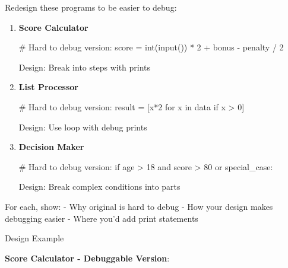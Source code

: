 \documentclass[
  letterpaper,
  DIV=11,
  numbers=noendperiod,
  oneside]{scrreprt}
\newenvironment{Shaded}{}{}
\newcommand{\BuiltInTok}[1]{\textcolor[rgb]{0.84,0.23,0.29}{#1}}
\newcommand{\CommentTok}[1]{\textcolor[rgb]{0.42,0.45,0.49}{#1}}
\newcommand{\ControlFlowTok}[1]{\textcolor[rgb]{0.84,0.23,0.29}{#1}}
\newcommand{\DecValTok}[1]{\textcolor[rgb]{0.00,0.36,0.77}{#1}}
\newcommand{\KeywordTok}[1]{\textcolor[rgb]{0.84,0.23,0.29}{#1}}
\newcommand{\NormalTok}[1]{\textcolor[rgb]{0.14,0.16,0.18}{#1}}
\newcommand{\OperatorTok}[1]{\textcolor[rgb]{0.14,0.16,0.18}{#1}}
\begin{document}
Redesign these programs to be easier to debug:

\begin{enumerate}
\def\labelenumi{\arabic{enumi}.}
\item
  \textbf{Score Calculator}

\begin{Shaded}
\begin{Highlighting}[]
\CommentTok{\# Hard to debug version:}
\NormalTok{score }\OperatorTok{=} \BuiltInTok{int}\NormalTok{(}\BuiltInTok{input}\NormalTok{()) }\OperatorTok{*} \DecValTok{2} \OperatorTok{+}\NormalTok{ bonus }\OperatorTok{{-}}\NormalTok{ penalty }\OperatorTok{/} \DecValTok{2}
\end{Highlighting}
\end{Shaded}

  Design: Break into steps with prints
\item
  \textbf{List Processor}

\begin{Shaded}
\begin{Highlighting}[]
\CommentTok{\# Hard to debug version:}
\NormalTok{result }\OperatorTok{=}\NormalTok{ [x}\OperatorTok{*}\DecValTok{2} \ControlFlowTok{for}\NormalTok{ x }\KeywordTok{in}\NormalTok{ data }\ControlFlowTok{if}\NormalTok{ x }\OperatorTok{\textgreater{}} \DecValTok{0}\NormalTok{]}
\end{Highlighting}
\end{Shaded}

  Design: Use loop with debug prints
\item
  \textbf{Decision Maker}

\begin{Shaded}
\begin{Highlighting}[]
\CommentTok{\# Hard to debug version:}
\ControlFlowTok{if}\NormalTok{ age }\OperatorTok{\textgreater{}} \DecValTok{18} \KeywordTok{and}\NormalTok{ score }\OperatorTok{\textgreater{}} \DecValTok{80} \KeywordTok{or}\NormalTok{ special\_case:}
\end{Highlighting}
\end{Shaded}

  Design: Break complex conditions into parts
\end{enumerate}

For each, show: - Why original is hard to debug - How your design makes
debugging easier - Where you'd add print statements

Design Example

\textbf{Score Calculator - Debuggable Version}:
\end{document}
